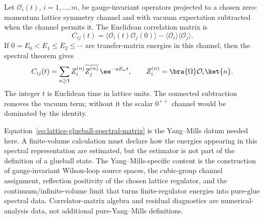 Let \(\mathcal O_i(t)\), \(i=1,\ldots,m\), be gauge-invariant operators
projected to a chosen zero-momentum lattice symmetry channel and with vacuum
expectation subtracted when the channel permits it.  The Euclidean correlation
matrix is
\begin{equation}
  C_{ij}(t)
  =
  \langle \mathcal O_i(t)\mathcal O_j(0)\rangle
  -
  \langle \mathcal O_i\rangle\langle\mathcal O_j\rangle .
  \label{eq:lattice-glueball-correlation-matrix}
\end{equation}
If \(0=E_0<E_1\le E_2\le\cdots\) are transfer-matrix energies in this channel,
then the spectral theorem gives
\begin{equation}
  C_{ij}(t)
  =
  \sum_{n\ge1}
  Z_i^{(n)}\overline{Z_j^{(n)}}\,\ee^{-aE_n t},
  \qquad
  Z_i^{(n)}=\bra{\Omega}\mathcal O_i\ket{n}.
  \label{eq:lattice-glueball-spectral-matrix}
\end{equation}
The integer \(t\) is Euclidean time in lattice units.  The connected
subtraction removes the vacuum term; without it the scalar \(0^{++}\) channel
would be dominated by the identity.

Equation~\eqref{eq:lattice-glueball-spectral-matrix} is the Yang--Mills
datum needed here.  A finite-volume calculation must declare how the energies
appearing in this spectral representation are estimated, but the estimator is
not part of the definition of a glueball state.  The Yang--Mills-specific
content is the construction of gauge-invariant Wilson-loop source spaces, the
cubic-group channel assignment, reflection positivity of the chosen lattice
regulator, and the continuum/infinite-volume limit that turns
finite-regulator energies into pure-glue spectral data.  Correlator-matrix
algebra and residual diagnostics are numerical-analysis data, not additional
pure-Yang--Mills definitions.

